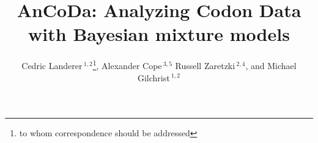 \documentclass{bioinfo}
\begin{document}

\title[AnCoDa]{AnCoDa: Analyzing Codon Data with Bayesian mixture models}
\author[
Landerer \textit{et~al}]{Cedric Landerer\,$^{1,2}$\footnote{
to whom correspondence should be addressed
},
Alexander Cope\,$^{3,5}$
Russell Zaretzki\,$^{2,4}$, and
Michael Gilchrist\,$^{1,2}$
}
\address{$^{1}$
Department of Ecology and Evolutionary Biology,
$^{2}$National Institute for Mathematical and Biological Synthesis,
$^{3}$Genome Science and Technology
$^{4}$Department of Statistics, Operations, and Management Science,
University of Tennessee, Knoxville, TN, USA,
$^{5}$Oak Ridge National Laboratory, Oak Ridge, TN, USA} 


\maketitle
\end{document}

